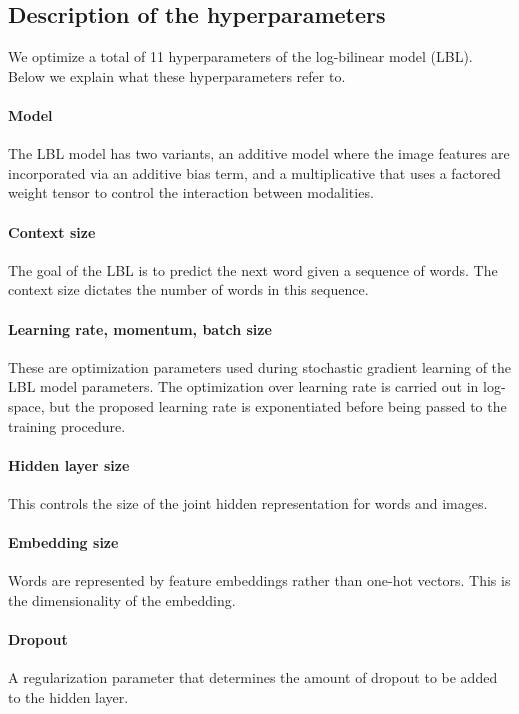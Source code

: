 \documentclass{article}
\begin{document}
\subsection{Description of the hyperparameters}
We optimize a total of 11 hyperparameters of the log-bilinear model (LBL). Below we explain what these hyperparameters refer to.

\paragraph{Model} The LBL model has two variants, an additive model where the image features are incorporated via an additive bias term, and a multiplicative that uses a factored weight tensor to control the interaction between modalities.

\paragraph{Context size} The goal of the LBL is to predict the next word given a sequence of words. The context size dictates the number of words in this sequence.

\paragraph{Learning rate, momentum, batch size} These are optimization parameters used during stochastic gradient learning of the LBL model parameters. The optimization over learning rate
is carried out in log-space, but the proposed learning rate is exponentiated before being passed
to the training procedure.

\paragraph{Hidden layer size} This controls the size of the joint hidden representation for words and images.

\paragraph{Embedding size} Words are represented by feature embeddings rather than one-hot vectors. This is the dimensionality of the embedding.

\paragraph{Dropout} A regularization parameter that determines the amount of dropout to be added to the hidden layer.
\end{document}
